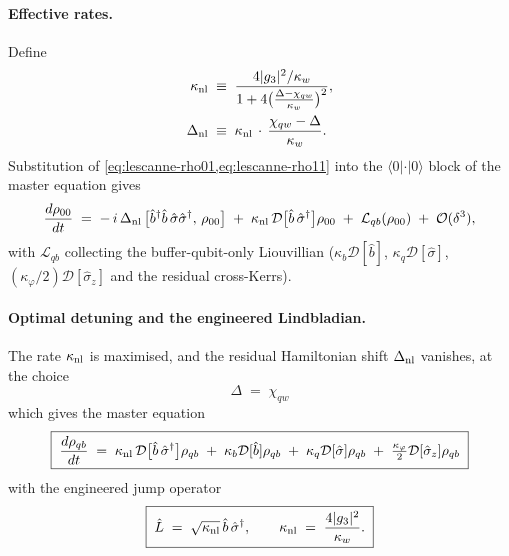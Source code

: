 \paragraph{Effective rates.}
Define
\begin{align}
\label{eq:lescanne-knl}
\kappa_{\rm nl} &\;\equiv\; \frac{4|g_3|^2/\kappa_w}{1+4\bigl(\tfrac{\Delta-\chi_{qw}}{\kappa_w}\bigr)^2},\\
\label{eq:lescanne-Dnl}
\Delta_{\rm nl} &\;\equiv\; \kappa_{\rm nl}\,\cdot\,\frac{\chi_{qw}-\Delta}{\kappa_w}.
\end{align}
Substitution of \cref{eq:lescanne-rho01,eq:lescanne-rho11} into the
$\langle 0|\cdot|0\rangle$ block of the master equation gives
\begin{equation}
\label{eq:lescanne-rho00}
\frac{d\rho_{00}}{dt}
\;=\; -\,i\,\Delta_{\rm nl}\,\bigl[\hat b^\dagger\hat b\,\hat\sigma\hat\sigma^\dagger,\,\rho_{00}\bigr]
\;+\; \kappa_{\rm nl}\,\mathcal D\bigl[\hat b\,\hat\sigma^\dagger\bigr]\rho_{00}
\;+\; \mathcal L_{qb}(\rho_{00})
\;+\; \mathcal O(\delta^3),
\end{equation}
with $\mathcal L_{qb}$ collecting the buffer-qubit-only Liouvillian
($\kappa_b\mathcal D[\hat b]$, $\kappa_q\mathcal D[\hat\sigma]$,
$(\kappa_\varphi/2)\mathcal D[\hat\sigma_z]$ and the residual
cross-Kerrs).

\paragraph{Optimal detuning and the engineered Lindbladian.}
The rate $\kappa_{\rm nl}$ is maximised, and the residual Hamiltonian
shift $\Delta_{\rm nl}$ vanishes, at the choice
\begin{equation}
\label{eq:lescanne-Delta-opt}
\boxed{\;\Delta \;=\; \chi_{qw}\;}
\end{equation}
which gives the master equation
\begin{equation}
\label{eq:lescanne-final-master}
\boxed{\;
\frac{d\rho_{qb}}{dt}
\;=\; \kappa_{\rm nl}\,\mathcal D\bigl[\hat b\,\hat\sigma^\dagger\bigr]\rho_{qb}
\;+\; \kappa_b\mathcal D[\hat b]\rho_{qb}
\;+\; \kappa_q\mathcal D[\hat\sigma]\rho_{qb}
\;+\; \tfrac{\kappa_\varphi}{2}\mathcal D[\hat\sigma_z]\rho_{qb}
\;}
\end{equation}
with the engineered jump operator
\begin{equation}
\label{eq:lescanne-Lop}
\boxed{\;
\hat{L} \;=\; \sqrt{\kappa_{\rm nl}}\,\hat b\,\hat\sigma^\dagger,
\qquad \kappa_{\rm nl} \;=\; \frac{4|g_3|^2}{\kappa_w}.
\;}
\end{equation}


